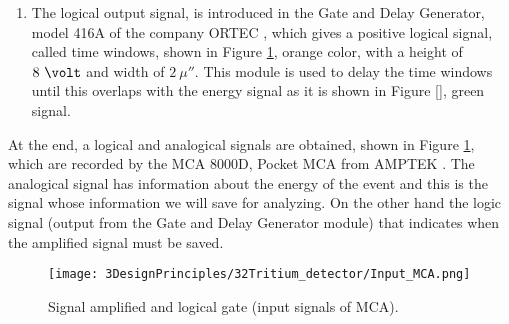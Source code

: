\begin{enumerate}
\begin{enumerate}
\begin{enumerate}
\end{enumerate}

\item{} The logical output signal, is introduced in the Gate and Delay Generator, model 416A of the company ORTEC \cite{DataSheetGateAndDelay}, which gives a positive logical signal, called time windows, shown in Figure \ref{fig:InputSignalsMCA}, orange color, with a height of $8~\volt$ and width of $2~\mu\second$. This module is used to delay the time windows until this overlaps with the energy signal as it is shown in Figure \ref{}, green signal.

\end{enumerate}

\end{enumerate}

At the end, a logical and analogical signals are obtained, shown in Figure \ref{fig:InputSignalsMCA}, which are recorded by the MCA 8000D, Pocket MCA from AMPTEK \cite{DataSheetMCA}. The analogical signal has information about the energy of the event and this is the signal whose information we will save for analyzing. On the other hand the logic signal (output from the Gate and Delay Generator module) that indicates when the amplified signal must be saved.

\begin{figure}[htbp]
\centering
\texttt{[image: 3DesignPrinciples/32Tritium\_detector/Input\_MCA.png]}
\caption{Signal amplified and logical gate (input signals of MCA).\label{fig:InputSignalsMCA}}
\end{figure}